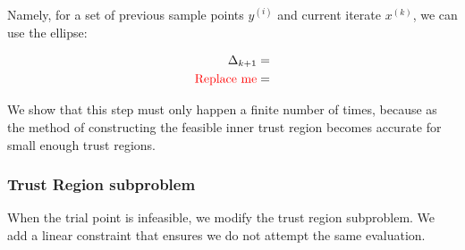\documentclass{article}
\theoremstyle{case}
\newcommand{\iteratek}{{x}^{(k)}}
\newcommand{\innertrk}{\color{red} \text{Replace me} \color{black} }
\begin{document}
Namely, for a set of previous sample points $y^{(i)}$ and current iterate $\iteratek$, we can use the ellipse:

\begin{align*}
\Delta_{k+1} = \\
\innertrk = 
\end{align*}


We show that this step must only happen a finite number of times, because as the method of constructing the feasible inner trust region becomes accurate for small enough trust regions.


\subsubsection{Trust Region subproblem}

When the trial point is infeasible, we modify the trust region subproblem.
We add a linear constraint that ensures we do not attempt the same evaluation.
\end{document}
